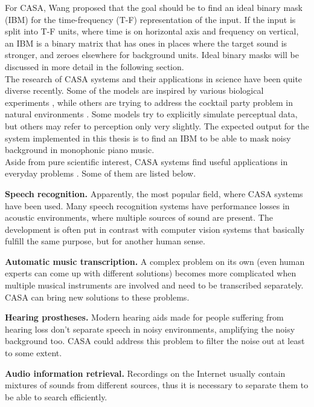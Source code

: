 For CASA, Wang \cite{Wang2006} proposed that the goal should be to find an ideal binary mask (IBM) for the time-frequency (T-F) representation of the input. If the input is split into T-F units, where time is on horizontal axis and frequency on vertical, an IBM is a binary matrix that has ones in places where the target sound is stronger, and zeroes elsewhere for background units. Ideal binary masks will be discussed in more detail in the following section.\\

The research of CASA systems and their applications in science \cite{Szabo2016} have been quite diverse recently. Some of the models are inspired by various biological experiments \cite{Wang2008}\cite{Boes2011}, while others are trying to address the cocktail party problem in natural environments \cite{Elhilali2008}. Some models try to explicitly simulate perceptual data, but others may refer to perception only very slightly. The expected output for the system implemented in this thesis is to find an IBM to be able to mask noisy background in monophonic piano music.\\

Aside from pure scientific interest, CASA systems find useful applications in everyday problems \cite{Wang2006}. Some of them are listed below.

\begin{description}
	\item\textbf{Speech recognition.} Apparently, the most popular field, where CASA systems have been used. Many speech recognition systems have performance losses in acoustic environments, where multiple sources of sound are present. The development is often put in contrast with computer vision systems that basically fulfill the same purpose, but for another human sense.
	\item\textbf{Automatic music transcription.} A complex problem on its own (even human experts can come up with different solutions) becomes more complicated when multiple musical instruments are involved and need to be transcribed separately. CASA can bring new solutions to these problems.
	\item\textbf{Hearing prostheses.} Modern hearing aids made for people suffering from hearing loss don't separate speech in noisy environments, amplifying the noisy background too. CASA could address this problem to filter the noise out at least to some extent.
	\item\textbf{Audio information retrieval.} Recordings on the Internet usually contain mixtures of sounds from different sources, thus it is necessary to separate them to be able to search efficiently.
\end{description}

